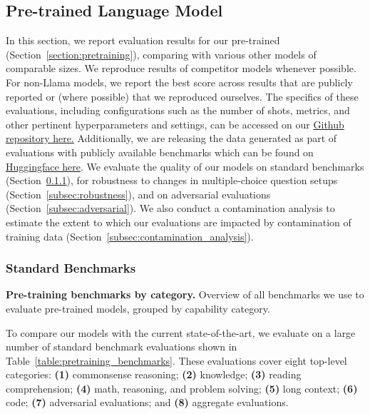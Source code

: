 \newcommand{\dieuwke}[1]{\textcolor{green!60!black}{DH: #1}}
\newcommand{\lovish}[1]{\textcolor{green!60!black}{LM: #1}}
\newcommand{\TBD}[1]{\textcolor{red!80!black}{\textbf{TBD:} #1}}

\subsection{Pre-trained Language Model}\label{results:pretrained_lm}

In this section, we report evaluation results for our pre-trained \llamathree (Section~\ref{section:pretraining}), comparing with various other models of comparable sizes.
We reproduce results of competitor models whenever possible.
For non-Llama models, we report the best score across results that are publicly reported or (where possible) that we reproduced ourselves.
The specifics of these evaluations, including configurations such as the number of shots, metrics, and other pertinent hyperparameters and settings, can be accessed on our \href{https://github.com/meta-llama/llama-models/blob/main/models/llama3_1/eval_details.md}{Github repository here.} Additionally, we are releasing the data generated as part of evaluations with publicly available benchmarks which can be found on \href{https://huggingface.co/meta-llama}{Huggingface here}.
We evaluate the quality of our models on standard benchmarks (Section~\ref{subsec:automatic_benchmarks}), for robustness to changes in multiple-choice question setups (Section~\ref{subsec:robustness}), and on adversarial evaluations (Section~\ref{subsec:adversarial}). 
We also conduct a contamination analysis to estimate the extent to which our evaluations are impacted by contamination of training data (Section~\ref{subsec:contamination_analysis}).

\subsubsection{Standard Benchmarks}
\label{subsec:automatic_benchmarks}

\begin{table}
    \centering
    
    \caption{\textbf{Pre-training benchmarks by category.} Overview of all benchmarks we use to evaluate pre-trained \llamathree models, grouped by capability category.} %
    \label{table:pretraining_benchmarks}
\end{table}

To compare our models with the current state-of-the-art, we evaluate \llamathree on a large number of standard benchmark evaluations shown in Table~\ref{table:pretraining_benchmarks}.
These evaluations cover eight top-level categories: \textbf{(1)} commonsense reasoning; \textbf{(2)} knowledge; \textbf{(3)} reading comprehension; \textbf{(4)} math, reasoning, and problem solving; \textbf{(5)} long context; \textbf{(6)} code; \textbf{(7)} adversarial evaluations; and \textbf{(8)} aggregate evaluations.

